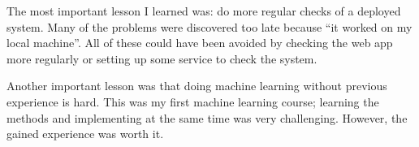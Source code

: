 The most important lesson I learned was: do more regular checks of a deployed system. Many of the problems were discovered too late because ``it worked on my local machine''. All of these could have been avoided by checking the web app more regularly or setting up some service to check the system.

Another important lesson was that doing machine learning without previous experience is hard. This was my first machine learning course; learning the methods and implementing at the same time was very challenging. However, the gained experience was worth it.
